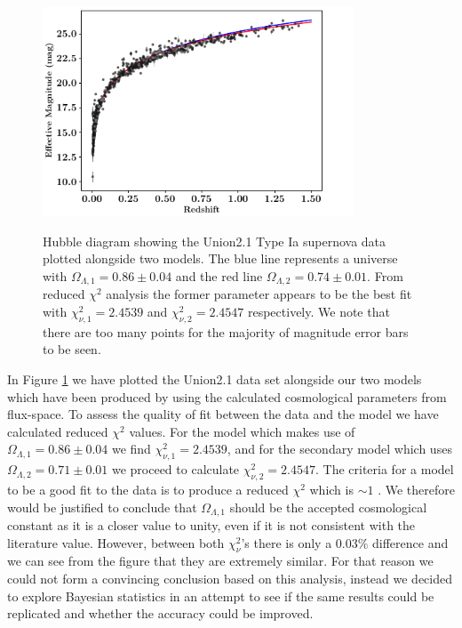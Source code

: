 \documentclass[twocolumn]{revtex4}
\begin{document}
{\begin{figure}[!h]
\begin{center}
\includegraphics[width=9.25cm]{results/hubble_diagram}
\vspace{-3ex}
\caption[]{Hubble diagram showing the Union2.1 Type Ia supernova data plotted alongside two models. The blue line represents a universe with $\Omega_{\Lambda,1}=0.86\pm0.04$ and the red line $\Omega_{\Lambda,2}=0.74\pm0.01$. From reduced $\chi^2$ analysis the former parameter appears to be the best fit with $\chi^2_{\nu,1}=2.4539$ and $\chi^2_{\nu,2}=2.4547$ respectively. We note that there are too many points for the majority of magnitude error bars to be seen.}
\vspace{-3ex}
\label{fig:hubble_diagram}
\end{center}
\end{figure}

In Figure \ref{fig:hubble_diagram} we have plotted the Union2.1 data set alongside our two models which have been produced by using the calculated cosmological parameters from flux-space. To assess the quality of fit between the data and the model we have calculated reduced $\chi^2$ values. For the model which makes use of $\Omega_{\Lambda,1}=0.86\pm0.04$ we find $\chi^2_{\nu,1}=2.4539$, and for the secondary model which uses $\Omega_{\Lambda,2}=0.71\pm0.01$ we proceed to calculate $\chi^2_{\nu,2}=2.4547$. The criteria for a model to be a good fit to the data is to produce a reduced $\chi^2$ which is $\sim1$ \cite{hugheshase}. We therefore would be justified to conclude that $\Omega_{\Lambda,1}$ should be the accepted cosmological constant as it is a closer value to unity, even if it is not consistent with the literature value.  However, between both $\chi^2_\nu$'s there is only a $0.03\%$ difference and we can see from the figure that they are extremely similar. For that reason we could not form a convincing conclusion based on this analysis, instead we decided to explore Bayesian statistics in an attempt to see if the same results could be replicated and whether the accuracy could be improved.

}
\end{document}
